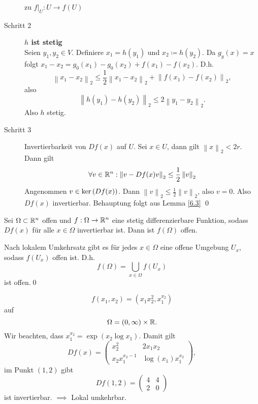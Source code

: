 \begin{proof*}
\begin{description}
\[			\]
			zu $ f|_U : U \to f(U) $
		\item[Schritt 2]
			\textbf{$ h $ ist stetig}\\
			Seien $ y_1, y_2 \in V $.
			Definiere $ x_1 = h(y_1) $ und $ x_2 \coloneqq h(y_2) $.
			Da $ g_y(x) = x $ folgt $ x_1 - x_2 = g_0(x_1) - g_0(x_2) + f(x_1) - f(x_2) $.
			D.h.
			\[
				\left\| x_1 - x_2 \right\| _2 \leq \frac{ 1 }{ 2 } \left\| x_1 - x_2 \right\| _2 + \left\| f(x_1) - f(x_2) \right\| _2,
			\]
			also
			\[
				\left\| h(y_1) - h(y_2) \right\| _2 \leq 2 \left\| y_1 - y_2 \right\| _2.
			\]
			Also $ h $ stetig.
		\item[Schritt 3]
				Invertierbarkeit von $ Df(x) $ auf $ U $.
				Sei $ x \in U $, dann gilt $ \left\| x \right\| _2 < 2r $.
				Dann gilt
				\[
					\forall v \in \mathbb{R} ^n : \left\| v - Df(x) v \right\| _2 \leq  \frac{ 1 }{ 2 } \left\| v \right\| _2
				\]
				Angenommen $ v \in \operatorname{ker} \left( Df(x) \right)  $.
				Dann $ \left\| v \right\| _2 \leq \frac{ 1 }{ 2 } \left\| v \right\| _2 $, also $ v = 0 $.
				Also $ Df(x) $ invertierbar.
				Behauptung folgt aus Lemma \ref{6.3} \qed
	\end{description}
\end{proof*}

\begin{corollary}
	Sei $ \Omega \subset \mathbb{R} ^n $ offen und $ f: \Omega \to \mathbb{R} ^n $ eine stetig differenzierbare Funktion, sodass $ Df(x) $ für alle $ x \in \Omega $ invertierbar ist.
	Dann ist $ f(\Omega) $ offen.
\end{corollary}
\begin{proof*}
	Nach lokalem Umkehrsatz gibt es für jedes $ x \in \Omega $ eine offene Umgebung $ U_x $, sodass $ f\left( U_x \right)  $ offen ist.
	D.h.  
	\[
		f(\Omega) = \bigcup_{x \in \Omega} f\left( U_x \right) 
	\]
	ist offen.\qed
\end{proof*}

\begin{example}
	\[
		f(x_1, x_2) = \left(x_1x_2^2, x_1^{x_2} \right)
	\]
	auf
	\[
		\Omega = \left( 0, \infty \right) \times \mathbb{R} .
	\]
	Wir beachten, dass $ x_1^{x_2} = \exp \left( x_2 \log x_1 \right)  $.
	Damit gilt
	\[
		Df(x) =
		\begin{pmatrix} 
			x_2^2 & 2x_1x_2 \\
			x_2x_1^{x_2 - 1} & \log \left( x_1 \right) x_1^{x_2}
		\end{pmatrix} ,
	\]
	im Punkt $ (1, 2) $ gibt
	\[
		Df(1, 2) = \begin{pmatrix} 4 & 4 \\ 2 & 0 \end{pmatrix} 
	\]
	ist invertierbar.
	$ \implies  $ Lokal umkehrbar.
\end{example}

